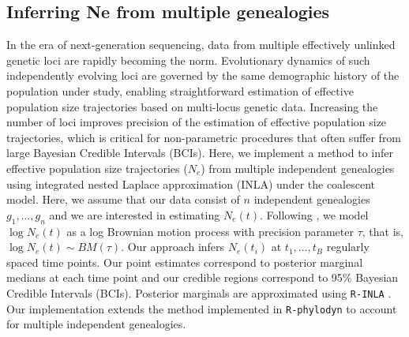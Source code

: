 \documentclass[english,titlepage]{article}
\begin{document}
\subsection*{Inferring Ne from multiple genealogies} 
In the era of next-generation sequencing, data from multiple effectively unlinked genetic loci are rapidly becoming the norm. Evolutionary dynamics of such independently evolving loci are governed by the same demographic history of the population under study, enabling straightforward estimation of effective
population size trajectories based on multi-locus genetic data. Increasing the number of loci improves precision of the  estimation of effective population size trajectories, which is critical for non-parametric procedures that often suffer from large Bayesian Credible Intervals (BCIs). Here, we implement a method to infer effective population size trajectories ($N_{e}$) from multiple independent genealogies using integrated nested Laplace approximation (INLA) under the coalescent model. Here, we assume that our data consist of $n$ independent genealogies $g_{1},\ldots,g_{n}$ and we are interested in estimating $N_{e}(t)$. Following \citet{palacios2012INLA}, we model $\log N_{e}(t)$ as a log Brownian motion process with precision parameter $\tau$, that is, $\log N_{e}(t) \sim BM(\tau)$. Our approach infers $N_{e}(t_{i})$ at $t_{1},\ldots,t_{B}$ regularly spaced time points. Our point estimates correspond to posterior marginal medians at each time point and our credible regions correspond to 95\% Bayesian Credible Intervals (BCIs). Posterior marginals are approximated using \texttt{R-INLA} \citep{INLA_2009} . Our implementation extends the method implemented in \texttt{R-phylodyn} to account for multiple independent genealogies.
\end{document}
